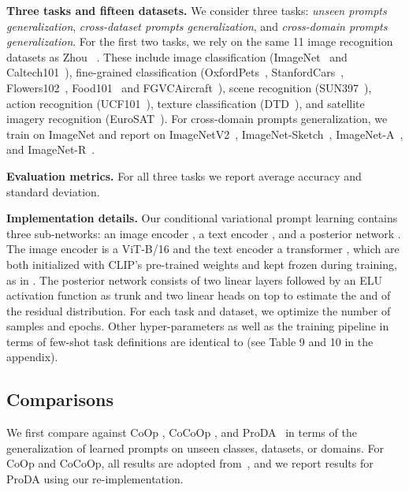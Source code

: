 \documentclass[10pt,twocolumn,letterpaper]{article}
\newcommand{\coop}{CoOp } \newcommand{\coopvpt}{CoOp+VPT } \newcommand{\cocoop}{CoCoOp } \newcommand{\cocoopvpt}{CoCoOp+VPT }
\begin{document}
\textbf{Three tasks and fifteen datasets.} We consider three tasks: \textit{unseen prompts generalization}, \textit{cross-dataset prompts generalization}, and \textit{cross-domain prompts generalization}. For the first two tasks, we rely on the same 11 image recognition datasets as Zhou \etal~\cite{zhou2022learning,zhou2022conditional}. These include image classification (ImageNet~\cite{deng2009imagenet} and Caltech101~\cite{fei2004learning}), fine-grained classification  (OxfordPets~\cite{parkhi2012cats}, StanfordCars~\cite{krause20133d}, Flowers102~\cite{nilsback2008automated}, Food101~\cite{bossard2014food} and FGVCAircraft~\cite{maji2013fine}), scene recognition (SUN397~\cite{xiao2010sun}), action recognition (UCF101~\cite{soomro2012dataset}), texture classification (DTD~\cite{cimpoi2014describing}), and satellite imagery recognition (EuroSAT~\cite{helber2019eurosat}). 
For cross-domain prompts generalization, we train on  ImageNet and report on ImageNetV2~\cite{recht2019imagenet}, ImageNet-Sketch~\cite{wang2019learning}, ImageNet-A~\cite{hendrycks2021natural}, and ImageNet-R~\cite{hendrycks2021many}.

\textbf{Evaluation metrics.} For all three tasks we report average accuracy and standard deviation.

\textbf{Implementation details.}
Our conditional variational prompt learning contains three sub-networks: an image encoder , a text encoder , and a posterior network . The image encoder  is a ViT-B/16 \cite{dosovitskiy2020image} and the text encoder  a transformer \cite{vaswani2017attention}, which are both initialized with CLIP's pre-trained weights and kept frozen during training, as in \cite{zhou2022learning, zhou2022conditional}. 
The 
posterior network
 consists of two linear layers followed by an ELU activation function as trunk and two linear heads on top to estimate the  and  of the residual distribution. For each task and dataset, we optimize the number of samples  and epochs. Other hyper-parameters as well as the training pipeline in terms of few-shot task definitions are identical to \cite{zhou2022learning, zhou2022conditional} (see Table 9 and 10 in the appendix).  \subsection{Comparisons}

We first compare against  
\coop \cite{zhou2022learning}, \cocoop \cite{zhou2022conditional}, and ProDA~\cite{lu2022prompt} in terms of the generalization of learned prompts on unseen classes, datasets, or domains. 
For CoOp and CoCoOp, all results are adopted from~\cite{zhou2022conditional}, and we report results for ProDA using our re-implementation. 
\end{document}
